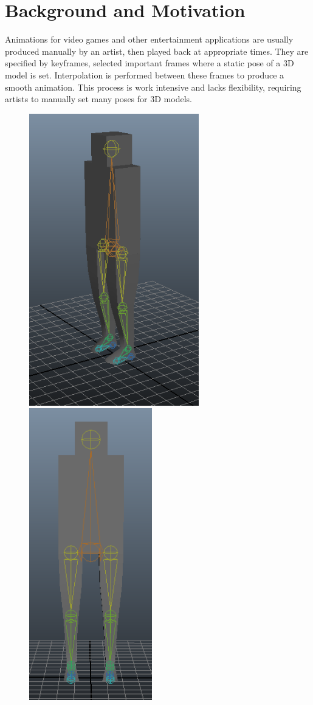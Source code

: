 \documentclass[landscape,26pt]{sciposter}
\begin{document}
\begin{minipage}[t]{10.5in}
	\section*{Background and Motivation}
        Animations for video games and other entertainment applications are usually produced manually by an artist, then played back at appropriate times.  They are specified by keyframes, selected important frames where a static pose of a 3D model is set.  Interpolation is performed between these frames to produce a smooth animation.  This process is work intensive and lacks flexibility, requiring artists to manually set many poses for 3D models.
		\begin{figure}
			\centering
            \includegraphics[height=5in]{skel_example/skel1.png}
            \includegraphics[height=5in]{skel_example/skel2.png}

\end{figure}
\end{minipage}
\end{document}

